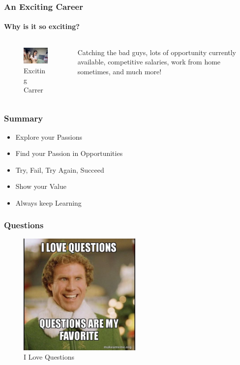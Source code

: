 \documentclass[aspectratio=169]{beamer}
\begin{document}
\begin{frame}
  \frametitle{An Exciting Career}
  \framesubtitle{Why is it so exciting?}
  \begin{columns}[onlytextwidth]
    \begin{column}{.30\textwidth}
      \begin{figure}
        \includegraphics[width=5.5cm,keepaspectratio]{exciting}
        \caption{Exciting Carrer}
      \end{figure}
    \end{column}
    \hfill
    \begin{column}{.60\textwidth}
        \begin{tcolorbox}[title=exciting.log,colback=gray]
          Catching the bad guys, lots of opportunity currently available, competitive salaries, work from home sometimes, and much more!
        \end{tcolorbox}
    \end{column}
  \end{columns}
\end{frame}

\begin{frame}
  \frametitle{Summary}
  \begin{itemize}
  \item{Explore your Passions}
  \item{Find your Passion in Opportunities}
  \item{Try, Fail, Try Again, Succeed}
  \item{Show your Value}
  \item{Always keep Learning}
  \end{itemize}
\end{frame}

\begin{frame}
  \frametitle{Questions}
  \begin{center}
    \begin{figure}
      \includegraphics[width=6cm,keepaspectratio]{questions_meme}
      \caption{I Love Questions}
    \end{figure}
  \end{center}
\end{frame}
\end{document}
